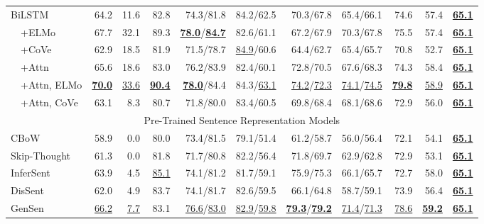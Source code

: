 \documentclass{article} \usepackage{iclr2019_conference,times}
\begin{document}
\begin{table*}[t]
\begin{tabular}{lrrrrrrrrrr}
BiLSTM & 64.2 & 11.6 & 82.8 & 74.3/81.8 & 84.2/62.5 & 70.3/67.8 & 65.4/66.1 & 74.6 & 57.4 & \textbf{\underline{65.1}} \\

~~+ELMo & 67.7 & 32.1 & 89.3 & \textbf{\underline{78.0}}/\textbf{\underline{84.7}} & 82.6/61.1 & 67.2/67.9 & 70.3/67.8 & 75.5 & 57.4 & \textbf{\underline{65.1}} \\

~~+CoVe & 62.9 & 18.5 & 81.9 & 71.5/78.7 & \underline{84.9}/60.6 & 64.4/62.7 & 65.4/65.7 & 70.8 & 52.7 & \textbf{\underline{65.1}} \\

~~+Attn & 65.6 & 18.6 & 83.0 & 76.2/83.9 & 82.4/60.1 & 72.8/70.5 & 67.6/68.3 & 74.3 & 58.4 & \textbf{\underline{65.1}} \\

~~+Attn, ELMo & \textbf{\underline{70.0}} & \underline{33.6} & \textbf{\underline{90.4}} & \textbf{\underline{78.0}}/84.4 & 84.3/\underline{63.1} & \underline{74.2}/\underline{72.3} & \underline{74.1}/\underline{74.5} & \textbf{\underline{79.8}} & \underline{58.9} & \textbf{\underline{65.1}} \\

~~+Attn, CoVe & 63.1 & 8.3 & 80.7 & 71.8/80.0 & 83.4/60.5 & 69.8/68.4 & 68.1/68.6 & 72.9 & 56.0 & \textbf{\underline{65.1}} \\

\midrule
\multicolumn{11}{c}{Pre-Trained Sentence Representation Models} \\
\midrule

CBoW & 58.9 & 0.0 & 80.0 & 73.4/81.5 & 79.1/51.4 & 61.2/58.7 & 56.0/56.4 & 72.1 & 54.1 & \textbf{\underline{65.1}} \\

Skip-Thought & 61.3 & 0.0 & 81.8 & 71.7/80.8 & 82.2/56.4 & 71.8/69.7 & 62.9/62.8 & 72.9 & 53.1 & \textbf{\underline{65.1}} \\

InferSent & 63.9 & 4.5 & \underline{85.1} & 74.1/81.2 & 81.7/59.1 & 75.9/75.3 & 66.1/65.7 & 72.7 & 58.0 & \textbf{\underline{65.1}} \\

DisSent & 62.0 & 4.9 & 83.7 & 74.1/81.7 & 82.6/59.5 & 66.1/64.8 & 58.7/59.1 & 73.9 & 56.4 & \textbf{\underline{65.1}} \\

GenSen & \underline{66.2} & \underline{7.7} & 83.1 & \underline{76.6}/\underline{83.0} & \underline{82.9}/\underline{59.8} & \textbf{\underline{79.3}}/\textbf{\underline{79.2}} & \underline{71.4}/\underline{71.3} & \underline{78.6} & \textbf{\underline{59.2}} & \textbf{\underline{65.1}} \\


\end{tabular}
\end{table*}
\end{document}
